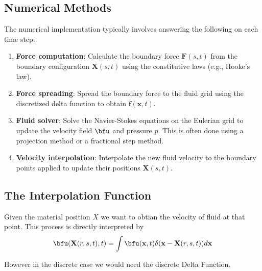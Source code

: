 \documentclass[../Immersed_Boundary_Method.tex]{subfiles}
\begin{document}
\subsection{Numerical Methods}
The numerical implementation typically involves answering the following on each time step:
\begin{enumerate}
    \item \textbf{Force computation}: Calculate the boundary force $\mathbf{F}(s, t)$ from the boundary configuration $\mathbf{X}(s, t)$ using the constitutive laws (e.g., Hooke's law).
    \item \textbf{Force spreading}: Spread the boundary force to the fluid grid using the discretized delta function to obtain $\mathbf{f}(\mathbf{x}, t)$.
    \item \textbf{Fluid solver}: Solve the Navier-Stokes equations on the Eulerian grid to update the velocity field $\bfu$ and pressure $p$. This is often done using a projection method or a fractional step method.
    \item \textbf{Velocity interpolation}: Interpolate the new fluid velocity to the boundary points applied to update their positions $\mathbf{X}(s, t)$.
\end{enumerate}

\subsection{The Interpolation Function}

Given the material position $X$ we want to obtian the velocity of fluid at that point.  This process is directly interpreted by 
\begin{equation}
    \bfu(\mathbf{X}(r, s, t), t)=\int \bfu(\mathbf{x}, t) \delta(\mathbf{x}-\mathbf{X}(r, s, t)) d \mathbf{x}
\end{equation}
\begin{figure}
    \centering
\end{figure}
However in the discrete case we would need the discrete Delta Function. \par
\end{document}
